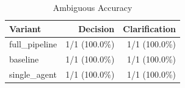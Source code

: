 \begin{table}[htbp]
\centering
\caption{Ambiguous Accuracy}
\label{tab:acc-ambig}
\begin{tabular}{l rr}
\toprule
Variant & Decision & Clarification \\
\midrule
  full\_pipeline & 1/1 (100.0\%) & 1/1 (100.0\%) \\
  baseline & 1/1 (100.0\%) & 1/1 (100.0\%) \\
  single\_agent & 1/1 (100.0\%) & 1/1 (100.0\%) \\
\bottomrule
\end{tabular}
\end{table}

